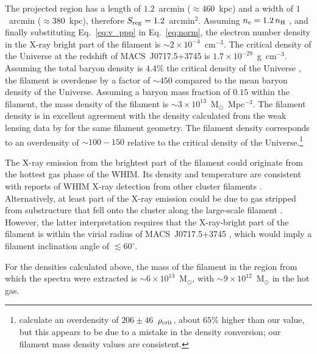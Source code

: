\documentclass[11pt,a4paper,useAMS,iop]{emulateapj}
\begin{document}
The projected region has a length of $1.2$~arcmin ($\approx 460$~kpc) and a width of $1$~arcmin ($\approx 380$~kpc), therefore $S_{\rm reg} = 1.2$~arcmin$^{2}$. Assuming $n_{\rm e} = 1.2\, n_{\rm H}$ \citep[e.g.,][]{Bohringer2010}, and finally substituting Eq.~\ref{eq:v_ppp} in Eq.~\ref{eq:norm}, the electron number density in the X-ray bright part of the filament is $\sim 2\times 10^{-4}$~cm$^{-3}$. The critical density of the Universe at the redshift of MACS~J0717.5+3745 is $1.7\times 10^{-29}$~g~cm$^{-3}$. Assuming the total baryon density is $4.4\%$ the critical density of the Universe \citep{Kirkman2003}, the filament is overdense by a factor of $\sim 450$ compared to the mean baryon density of the Universe. Assuming a baryon mass fraction of $0.15$ \citep[e.g.,][]{Mantz2014} within the filament, the mass density of the filament is $\sim 3\times 10^{13}$~M$_{\odot}$~Mpc$^{-3}$. The filament density is in excellent agreement with the density calculated from the weak lensing data by \citet{Jauzac2012} for the same filament geometry. The filament density corresponds to an overdensity of $\sim 100-150$ relative to the critical density of the Universe.\footnote{\citet{Jauzac2012} calculate an overdensity of $206\pm 46$~$\rho_{\rm crit}$, about $65\%$ higher than our value, but this appears to be due to a mistake in the density conversion; our filament mass density values are consistent.} 

The X-ray emission from the brightest part of the filament could originate from the hottest gas phase of the WHIM. Its density and temperature are consistent with reports of WHIM X-ray detection from other cluster filaments \citep[e.g.,][]{Werner2008, Eckert2015}. Alternatively, at least part of the X-ray emission could be due to gas stripped from substructure that fell onto the cluster along the large-scale filament \citep[similarly to what is seen in A85;][]{Ichinohe2015}. However, the latter interpretation requires that the X-ray-bright part of the filament is within the virial radius of MACS~J0717.5+3745 \citep[$r_{\rm 138} = 2.5$~Mpc;][]{Medezinski2013}, which would imply a filament inclination angle of $\lesssim 60^\circ$. 

For the densities calculated above, the mass of the filament in the region from which the spectra were extracted is $\sim 6\times 10^{13}$~M$_\odot$, with $\sim 9\times 10^{12}$~M$_\odot$ in the hot gas. 
\end{document}
